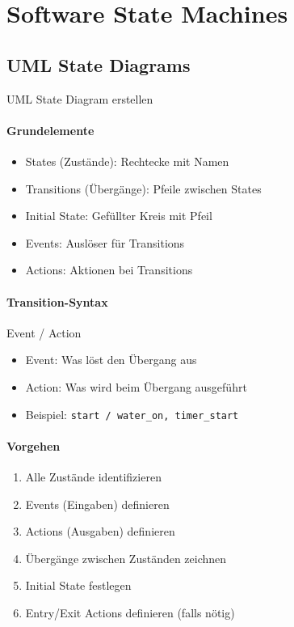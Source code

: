 \section{Software State Machines}

\subsection{UML State Diagrams}

\begin{KR}{UML State Diagram erstellen}\\
    \paragraph{Grundelemente}
    \begin{itemize}
        \item States (Zustände): Rechtecke mit Namen
        \item Transitions (Übergänge): Pfeile zwischen States
        \item Initial State: Gefüllter Kreis mit Pfeil
        \item Events: Auslöser für Transitions
        \item Actions: Aktionen bei Transitions
    \end{itemize}
    
    \paragraph{Transition-Syntax}
    Event / Action
    \begin{itemize}
        \item Event: Was löst den Übergang aus
        \item Action: Was wird beim Übergang ausgeführt
        \item Beispiel: \texttt{start / water\_on, timer\_start}
    \end{itemize}
    
    \paragraph{Vorgehen}
    \begin{enumerate}
        \item Alle Zustände identifizieren
        \item Events (Eingaben) definieren
        \item Actions (Ausgaben) definieren
        \item Übergänge zwischen Zuständen zeichnen
        \item Initial State festlegen
        \item Entry/Exit Actions definieren (falls nötig)
    \end{enumerate}
    

\end{KR}
